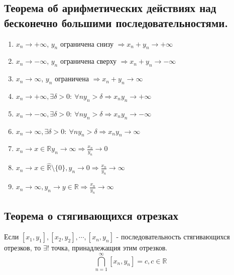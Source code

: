 \documentclass{article}
\begin{document}
\subsection{Теорема об арифметических действиях над бесконечно большими последовательностями.}
\begin{enumerate}
	\item $x_n \to +\infty$, $y_n$ ограничена снизу $\Rightarrow x_n + y_n \to +\infty$
	\item $x_n \to -\infty$, $y_n$ ограничена сверху $\Rightarrow x_n + y_n \to -\infty$
	\item $x_n \to \infty$, $y_n$ ограничена $\Rightarrow x_n + y_n \to \infty$
	\item $x_n \to +\infty, \exists\delta > 0:\ \forall n y_n > \delta \Rightarrow x_ny_n \to +\infty$
	\item $x_n \to -\infty, \exists\delta > 0:\ \forall n y_n > \delta \Rightarrow x_ny_n \to -\infty$
	\item $x_n \to \infty, \exists\delta > 0:\ \forall n y_n > \delta \Rightarrow x_ny_n \to \infty$
	\item $x_n \to x \in \mathbb{R} y_n \to \infty \Rightarrow \frac{x_n}{y_n} \to 0$
	\item $x_n \to x \in \hat{\mathbb{R}}\setminus\{0\}, y_n \to 0 \Rightarrow \frac{x_n}{y_n} \to \infty$
	\item $x_n \to \infty, y_n \to y \in \mathbb{R} \Rightarrow  \frac{x_n}{y_n} \to \infty$
\end{enumerate}

\subsection{Теорема о стягивающихся отрезках}
 Если $[x_1, y_1], [x_2, y_2], \cdots, [x_n, y_n]$ - последовательность стягивающихся отрезков, то $\exists!$ точка, принадлежащия этим отрезков.
\begin{equation*}
	\displaystyle\bigcap\limits_{n = 1}^{\infty}[x_n, y_n] = c, c \in \mathbb{R}
\end{equation*}
\end{document}
